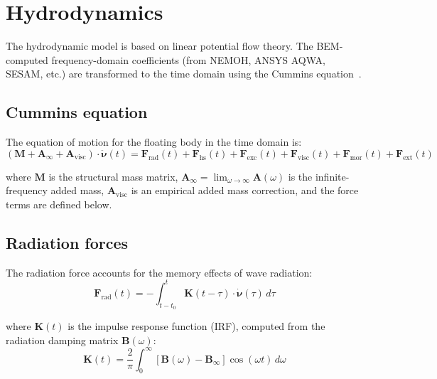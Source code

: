 \documentclass[11pt]{article}
\begin{document}
\section{Hydrodynamics}
\label{sec:hydrodynamics}

The hydrodynamic model is based on linear potential flow theory. The BEM-computed frequency-domain coefficients (from NEMOH, ANSYS AQWA, SESAM, etc.) are transformed to the time domain using the Cummins equation~\cite{Cummins-1962}.

\subsection{Cummins equation}

The equation of motion for the floating body in the time domain is:
\begin{equation}
\left(\mathbf{M} + \mathbf{A}_\infty + \mathbf{A}_{\text{visc}}\right)\cdot\ddot{\boldsymbol{\nu}}(t) = \mathbf{F}_{\text{rad}}(t) + \mathbf{F}_{\text{hs}}(t) + \mathbf{F}_{\text{exc}}(t) + \mathbf{F}_{\text{visc}}(t) + \mathbf{F}_{\text{mor}}(t) + \mathbf{F}_{\text{ext}}(t)
\label{eq:cummins}
\end{equation}

where $\mathbf{M}$ is the structural mass matrix, $\mathbf{A}_\infty = \lim_{\omega\to\infty}\mathbf{A}(\omega)$ is the infinite-frequency added mass, $\mathbf{A}_{\text{visc}}$ is an empirical added mass correction, and the force terms are defined below.

\subsection{Radiation forces}

The radiation force accounts for the memory effects of wave radiation:
\begin{equation}
\mathbf{F}_{\text{rad}}(t) = -\int_{t-t_0}^{t}\mathbf{K}(t-\tau)\cdot\dot{\boldsymbol{\nu}}(\tau)\,d\tau
\end{equation}

where $\mathbf{K}(t)$ is the impulse response function (IRF), computed from the radiation damping matrix $\mathbf{B}(\omega)$:
\begin{equation}
\mathbf{K}(t) = \frac{2}{\pi}\int_0^\infty\left[\mathbf{B}(\omega) - \mathbf{B}_\infty\right]\cos(\omega t)\,d\omega
\end{equation}
\end{document}
